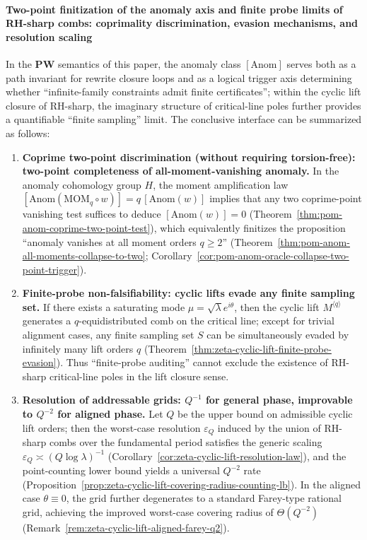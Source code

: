 \paragraph{Two-point finitization of the anomaly axis and finite probe limits of RH-sharp combs: coprimality discrimination, evasion mechanisms, and resolution scaling}
In the \(\mathbf{PW}\) semantics of this paper, the anomaly class \([\mathrm{Anom}]\) serves both as a path invariant for rewrite closure loops and as a logical trigger axis determining whether ``infinite-family constraints admit finite certificates''; within the cyclic lift closure of RH-sharp, the imaginary structure of critical-line poles further provides a quantifiable ``finite sampling'' limit. The conclusive interface can be summarized as follows:
\begin{enumerate}
  \item \textbf{Coprime two-point discrimination (without requiring torsion-free): two-point completeness of all-moment-vanishing anomaly.}
  In the anomaly cohomology group \(H\), the moment amplification law
  \(
  [\mathrm{Anom}(\mathrm{MOM}_q\circ w)]=q\,[\mathrm{Anom}(w)]
  \)
  implies that any two coprime-point vanishing test suffices to deduce \([\mathrm{Anom}(w)]=0\) (Theorem~\ref{thm:pom-anom-coprime-two-point-test}), which equivalently finitizes the proposition ``anomaly vanishes at all moment orders \(q\ge 2\)'' (Theorem~\ref{thm:pom-anom-all-moments-collapse-to-two}; Corollary~\ref{cor:pom-anom-oracle-collapse-two-point-trigger}).

  \item \textbf{Finite-probe non-falsifiability: cyclic lifts evade any finite sampling set.}
  If there exists a saturating mode \(\mu=\sqrt{\lambda}e^{i\theta}\), then the cyclic lift \(M^{\langle q\rangle}\) generates a \(q\)-equidistributed comb on the critical line;
  except for trivial alignment cases, any finite sampling set \(S\) can be simultaneously evaded by infinitely many lift orders \(q\) (Theorem~\ref{thm:zeta-cyclic-lift-finite-probe-evasion}).
  Thus ``finite-probe auditing'' cannot exclude the existence of RH-sharp critical-line poles in the lift closure sense.

  \item \textbf{Resolution of addressable grids: \texorpdfstring{$Q^{-1}$}{Q^-1} for general phase, improvable to \texorpdfstring{$Q^{-2}$}{Q^-2} for aligned phase.}
  Let \(Q\) be the upper bound on admissible cyclic lift orders; then the worst-case resolution \(\varepsilon_Q\) induced by the union of RH-sharp combs over the fundamental period satisfies the generic scaling
  \(
  \varepsilon_Q\asymp (Q\log\lambda)^{-1}
  \)
  (Corollary~\ref{cor:zeta-cyclic-lift-resolution-law}), and the point-counting lower bound yields a universal \(Q^{-2}\) rate (Proposition~\ref{prop:zeta-cyclic-lift-covering-radius-counting-lb}).
  In the aligned case \(\theta\equiv 0\), the grid further degenerates to a standard Farey-type rational grid, achieving the improved worst-case covering radius of \(\Theta(Q^{-2})\) (Remark~\ref{rem:zeta-cyclic-lift-aligned-farey-q2}).
\end{enumerate}

